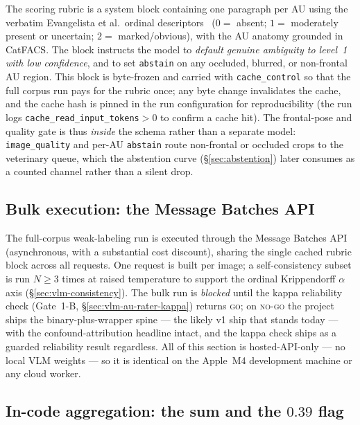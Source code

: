 The scoring rubric is a system block containing one paragraph per AU using the
verbatim Evangelista et al.\ ordinal descriptors~\cite{evangelista2019}
($0=$ absent; $1=$ moderately present or uncertain; $2=$
marked/obvious), with the AU anatomy grounded in CatFACS. The block instructs
the model to \emph{default genuine ambiguity to level~1 with low confidence},
and to set \texttt{abstain} on any occluded, blurred, or non-frontal AU region.
This block is byte-frozen and carried with \texttt{cache\_control} so that the
full corpus run pays for the rubric once; any byte change invalidates the cache,
and the cache hash is pinned in the run configuration for reproducibility (the
run logs \texttt{cache\_read\_input\_tokens}$>0$ to confirm a cache hit). The
frontal-pose and quality gate is thus \emph{inside} the schema rather than a
separate model: \texttt{image\_quality} and per-AU \texttt{abstain} route
non-frontal or occluded crops to the veterinary queue, which the abstention
curve (\S\ref{sec:abstention}) later consumes as a counted channel rather than a
silent drop.

\subsection{Bulk execution: the Message Batches API}
\label{sec:vlm-batch}

The full-corpus weak-labeling run is executed through the Message Batches API
(asynchronous, with a substantial cost discount), sharing the single cached
rubric block across all requests. One request is built per image; a
self-consistency subset is run $N\geq 3$ times at raised temperature to support
the ordinal Krippendorff $\alpha$ axis (\S\ref{sec:vlm-consistency}). The bulk
run is \emph{blocked} until the kappa reliability check (Gate~1-B,
\S\ref{sec:vlm-au-rater-kappa}) returns \textsc{go}; on \textsc{no-go} the
project ships the binary-plus-wrapper spine --- the likely v1 ship that stands today --- with the confound-attribution headline intact, and the kappa check ships as
a guarded reliability result regardless. All of this section is hosted-API-only --- no local
VLM weights --- so it is identical on the Apple~M4 development machine or any
cloud worker.

\subsection{In-code aggregation: the sum and the $0.39$ flag}
\label{sec:vlm-aggregation}

